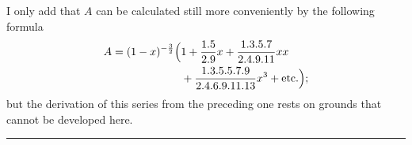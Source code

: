 I only add that \(A\) can be calculated still more conveniently by the following formula
\[
\begin{aligned}
A=(1-x)^{-\frac32}\Bigl(&1+\frac{1.5}{2.9}x+\frac{1.3.5.7}{2.4.9.11}xx\\
&+\frac{1.3.5.5.7.9}{2.4.6.9.11.13}x^3+\text{etc.}\Bigr);
\end{aligned}
\]
but the derivation of this series from the preceding one rests on grounds that cannot be developed here\HistoricalNoteEight{Cf. Volume III p. 209.]}.
\begin{center}\rule{.18\textwidth}{.35pt}\end{center}
